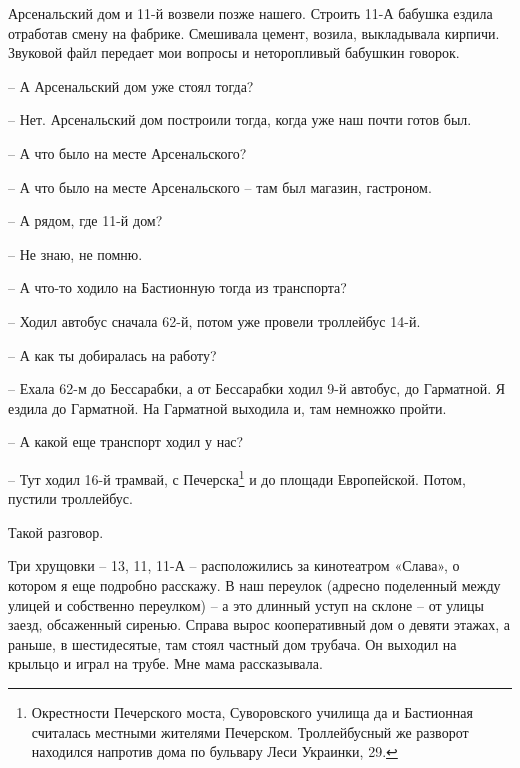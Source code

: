 
   Арсенальский дом и 11-й возвели позже нашего. Строить 11-А бабушка ездила отработав смену на фабрике. Смешивала цемент, возила, выкладывала кирпичи. Звуковой файл передает мои вопросы и неторопливый бабушкин говорок.

 – А Арсенальский дом уже стоял тогда?

 – Нет. Арсенальский дом построили тогда, когда уже наш почти готов был.

 – А что было на месте Арсенальского?

 – А что было на месте Арсенальского – там был магазин, гастроном.

 – А рядом, где 11-й дом?

 – Не знаю, не помню.

 – А что-то ходило на Бастионную тогда из транспорта?

 – Ходил автобус сначала 62-й, потом уже провели троллейбус 14-й.

 – А как ты добиралась на работу?

 – Ехала 62-м до Бессарабки, а от Бессарабки ходил 9-й автобус, до Гарматной. Я ездила до Гарматной. На Гарматной выходила и, там немножко пройти.

 – А какой еще транспорт ходил у нас?

 – Тут ходил 16-й трамвай, с Печерска\footnote{Окрестности Печерского моста, Суворовского училища да и Бастионная считалась местными жителями Печерском. Троллейбусный же разворот находился напротив дома по бульвару Леси Украинки, 29.} и до площади Европейской. Потом, пустили троллейбус. 

Такой разговор.

Три хрущовки – 13, 11, 11-А – расположились за кинотеатром «Слава», о котором я еще подробно расскажу. В наш переулок (адресно поделенный между улицей и собственно переулком) – а это длинный уступ на склоне – от улицы заезд, обсаженный сиренью. Справа вырос кооперативный дом о девяти этажах, а раньше, в шестидесятые, там стоял частный дом трубача. Он выходил на крыльцо и играл на трубе. Мне мама рассказывала.

